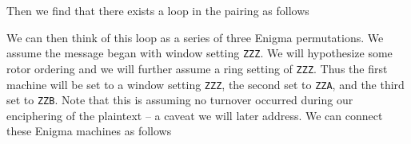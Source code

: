\noindent Then we find that there exists a loop in the pairing as follows

\begin{center}
\end{center}
We can then think of this loop as a series of three Enigma
permutations. We assume the message began with window setting
\texttt{ZZZ}. We will hypothesize some rotor ordering and we will
further assume a ring setting of \texttt{ZZZ}. Thus the first machine
will be set to a window setting \texttt{ZZZ}, the second set to
\texttt{ZZA}, and the third set to \texttt{ZZB}. Note that this is
assuming no turnover occurred during our enciphering of the plaintext
-- a caveat we will later address. We can connect these Enigma
machines as follows
